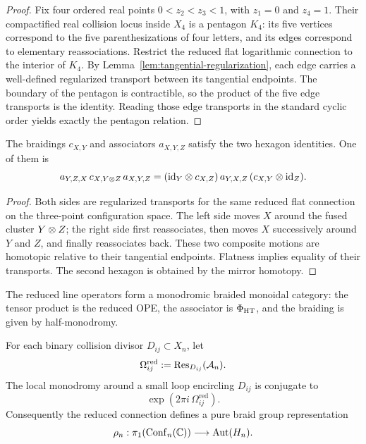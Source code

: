 \begin{proof}
Fix four ordered real points $0<z_2<z_3<1$, with $z_1=0$ and $z_4=1$. Their compactified real collision locus inside $X_4$ is a pentagon $K_4$: its five vertices correspond to the five parenthesizations of four letters, and its edges correspond to elementary reassociations. Restrict the reduced flat logarithmic connection to the interior of $K_4$. By Lemma~\ref{lem:tangential-regularization}, each edge carries a well-defined regularized transport between its tangential endpoints. The boundary of the pentagon is contractible, so the product of the five edge transports is the identity. Reading those edge transports in the standard cyclic order yields exactly the pentagon relation.
\end{proof}

\begin{theorem}%
The braidings $c_{X,Y}$ and associators $a_{X,Y,Z}$ satisfy the two hexagon identities. One of them is
\[
 a_{Y,Z,X}\,c_{X,Y\otimes Z}\,a_{X,Y,Z}
 =
 (\mathrm{id}_Y\otimes c_{X,Z})\,a_{Y,X,Z}\,(c_{X,Y}\otimes \mathrm{id}_Z).
\]
\end{theorem}

\begin{proof}
Both sides are regularized transports for the same reduced flat connection on the three-point configuration space. The left side moves $X$ around the fused cluster $Y\otimes Z$; the right side first reassociates, then moves $X$ successively around $Y$ and $Z$, and finally reassociates back. These two composite motions are homotopic relative to their tangential endpoints. Flatness implies equality of their transports. The second hexagon is obtained by the mirror homotopy.
\end{proof}

\begin{corollary}%
The reduced line operators form a monodromic braided monoidal category: the tensor product is the reduced OPE, the associator is $\Phi_{\mathrm{HT}}$, and the braiding is given by half-monodromy.
\end{corollary}

\begin{theorem}%
For each binary collision divisor $D_{ij}\subset X_n$, let
\[
 \Omega_{ij}^{\mathrm{red}}:=\mathrm{Res}_{D_{ij}}(\mathcal A_n).
\]
The local monodromy around a small loop encircling $D_{ij}$ is conjugate to
\[
 \exp(2\pi i\,\Omega_{ij}^{\mathrm{red}}).
\]
Consequently the reduced connection defines a pure braid group representation
\[
 \rho_n: \pi_1(\mathrm{Conf}_n(\mathbb C)) \longrightarrow \mathrm{Aut}(H_n).
\]
\end{theorem}

